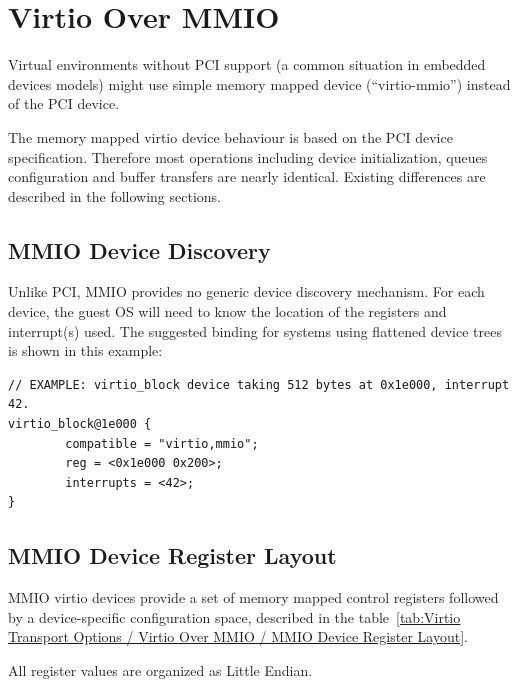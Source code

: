 \section{Virtio Over MMIO}\label{sec:Virtio Transport Options / Virtio Over MMIO}

Virtual environments without PCI support (a common situation in
embedded devices models) might use simple memory mapped device
(``virtio-mmio'') instead of the PCI device.

The memory mapped virtio device behaviour is based on the PCI
device specification. Therefore most operations including device
initialization, queues configuration and buffer transfers are
nearly identical. Existing differences are described in the
following sections.

\subsection{MMIO Device Discovery}\label{sec:Virtio Transport Options / Virtio Over MMIO / MMIO Device Discovery}

Unlike PCI, MMIO provides no generic device discovery mechanism.  For each
device, the guest OS will need to know the location of the registers
and interrupt(s) used.  The suggested binding for systems using
flattened device trees is shown in this example:

\begin{lstlisting}
// EXAMPLE: virtio_block device taking 512 bytes at 0x1e000, interrupt 42.
virtio_block@1e000 {
        compatible = "virtio,mmio";
        reg = <0x1e000 0x200>;
        interrupts = <42>;
}
\end{lstlisting}

\subsection{MMIO Device Register Layout}\label{sec:Virtio Transport Options / Virtio Over MMIO / MMIO Device Register Layout}

MMIO virtio devices provide a set of memory mapped control
registers followed by a device-specific configuration space,
described in the table~\ref{tab:Virtio Transport Options / Virtio Over MMIO / MMIO Device Register Layout}.

All register values are organized as Little Endian.

\newcommand{\mmioreg}[5]{%
  {\field{#1}} \newline #3 \newline #4 & {\bf#2} \newline #5 \\
}

